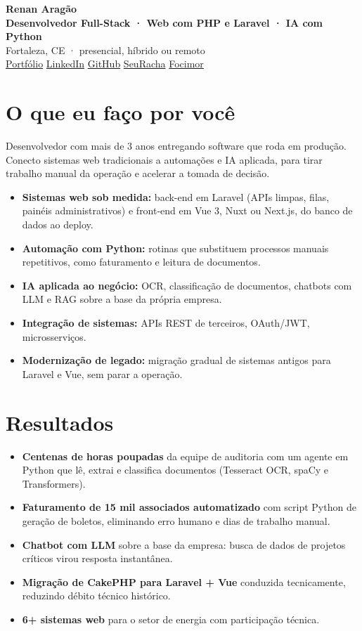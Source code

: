 \documentclass[10pt,a4paper]{article}
\newcommand{\link}[2]{\href{#1}{\color{accent}#2}}
\begin{document}
\fontsize{9.5}{11.4}\selectfont

{\Huge\bfseries Renan Aragão}\\[3pt]
{\large\color{accent}\bfseries Desenvolvedor Full-Stack · Web com PHP e Laravel · IA com Python}\\[3pt]
{\small\color{muted} Fortaleza, CE · presencial, híbrido ou remoto}\\[1pt]
{\small \link{https://renanaragao9.github.io/renanaragao9}{Portfólio} \quad
\link{https://linkedin.com/in/renan-aragao/}{LinkedIn} \quad
\link{https://github.com/renanaragao9}{GitHub} \quad
\link{https://seuracha.aragaolabs.com.br}{SeuRacha} \quad
\link{https://focimor.aragaolabs.com.br}{Focimor}}

\section{O que eu faço por você}
Desenvolvedor com mais de 3 anos entregando software que roda em produção. Conecto sistemas web tradicionais a automações e IA aplicada, para tirar trabalho manual da operação e acelerar a tomada de decisão.
\begin{itemize}
  \item \textbf{Sistemas web sob medida:} back-end em Laravel (APIs limpas, filas, painéis administrativos) e front-end em Vue 3, Nuxt ou Next.js, do banco de dados ao deploy.
  \item \textbf{Automação com Python:} rotinas que substituem processos manuais repetitivos, como faturamento e leitura de documentos.
  \item \textbf{IA aplicada ao negócio:} OCR, classificação de documentos, chatbots com LLM e RAG sobre a base da própria empresa.
  \item \textbf{Integração de sistemas:} APIs REST de terceiros, OAuth/JWT, microsserviços.
  \item \textbf{Modernização de legado:} migração gradual de sistemas antigos para Laravel e Vue, sem parar a operação.
\end{itemize}

\section{Resultados}
\begin{itemize}
  \item \textbf{Centenas de horas poupadas} da equipe de auditoria com um agente em Python que lê, extrai e classifica documentos (Tesseract OCR, spaCy e Transformers).
  \item \textbf{Faturamento de 15 mil associados automatizado} com script Python de geração de boletos, eliminando erro humano e dias de trabalho manual.
  \item \textbf{Chatbot com LLM} sobre a base da empresa: busca de dados de projetos críticos virou resposta instantânea.
  \item \textbf{Migração de CakePHP para Laravel + Vue} conduzida tecnicamente, reduzindo débito técnico histórico.
  \item \textbf{6+ sistemas web} para o setor de energia com participação técnica.
\end{itemize}
\end{document}
